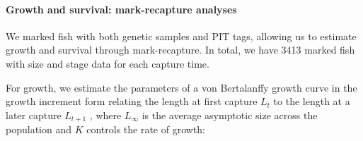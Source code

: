 \documentclass[12pt, oneside]{article}   	%
\begin{document}



\paragraph*{Growth and survival: mark-recapture analyses}

We marked fish with both genetic samples and PIT tags, allowing us to estimate growth and survival through mark-recapture. In total, we have 3413 marked fish with size and stage data for each capture time. 

For growth, we estimate the parameters of a von Bertalanffy growth curve \citep{fabens1965properties} in the growth increment form relating the length at first capture $L_t$ to the length at a later capture $L_{t+1}$ \citep{hart2009estimating}, where $L_\infty$ is the average asymptotic size across the population and $K$ controls the rate of growth: %
\end{document}
